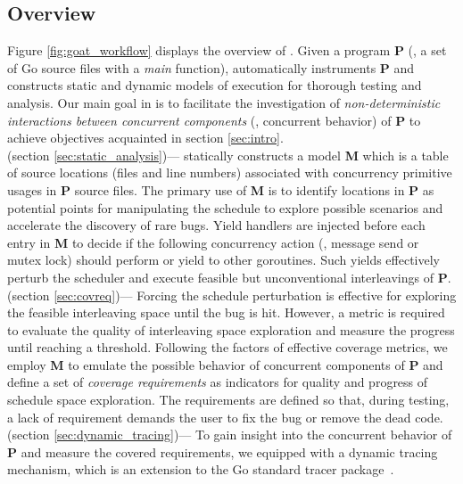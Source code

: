 \subsection{Overview}
\label{sec:overview}
Figure \ref{fig:goat_workflow} displays the overview of \goat.
%
Given a program \textbf{P} (\ie, a set of Go source files with a \textit{main} function), \goat automatically instruments \textbf{P} and constructs static and dynamic models of execution for thorough testing and analysis.
%
Our main goal in \goat is to facilitate the investigation of \textit{non-deterministic interactions between concurrent components} (\ie, concurrent behavior) of \textbf{P} to achieve objectives acquainted in section \ref{sec:intro}.
%
\\
 (section \ref{sec:static_analysis})---
\goat statically constructs a model \textbf{M} which is a table of source locations (files and line numbers) associated with concurrency primitive usages in \textbf{P} source files.
%
The primary use of \textbf{M} is to identify locations in \textbf{P} as potential points for manipulating the schedule to explore possible scenarios and accelerate the discovery of rare bugs.
%
Yield handlers are injected before each entry in \textbf{M} to decide if the following concurrency action (\eg, message send or mutex lock) should perform or yield to other goroutines.
%
Such yields effectively perturb the scheduler and execute feasible but unconventional interleavings of \textbf{P}.
%
\\
 (section \ref{sec:covreq})---
Forcing the schedule perturbation is effective for exploring the feasible interleaving space until the bug is hit.
%
However, a metric is required to evaluate the quality of interleaving space exploration and measure the progress until reaching a threshold.
%
Following the factors of effective coverage metrics, we employ \textbf{M} to emulate the possible behavior of concurrent components of \textbf{P} and define a set of \textit{coverage requirements} as indicators for quality and progress of schedule space exploration.
%
The requirements are defined so that, during testing, a lack of requirement demands the user to fix the bug or remove the dead code.
\\
 (section \ref{sec:dynamic_tracing})---
To gain insight into the concurrent behavior of \textbf{P} and measure the covered requirements, we equipped \goat with a dynamic tracing mechanism, which is an extension to the Go standard tracer package~\cite{go-cmd-trace}.
